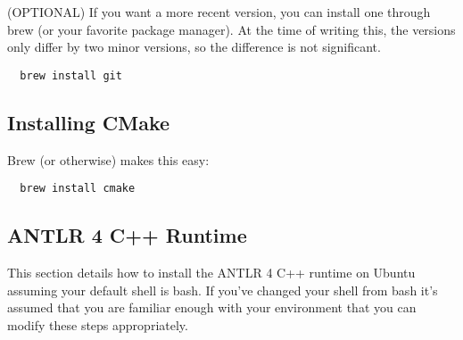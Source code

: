 \documentclass[../setup.tex]{subfiles}
\begin{document}
(OPTIONAL) If you want a more recent version, you can install one through brew (or your favorite
package manager). At the time of writing this, the versions only differ by two minor versions, so
the difference is not significant.
\begin{lstlisting}
  brew install git
\end{lstlisting}

\subsection{Installing CMake}
Brew (or otherwise) makes this easy:
\begin{lstlisting}
  brew install cmake
\end{lstlisting}

\subsection{ANTLR 4 C++ Runtime}
This section details how to install the ANTLR 4 C++ runtime on Ubuntu assuming your default shell
is bash. If you've changed your shell from bash it's assumed that you are familiar enough with your
environment that you can modify these steps appropriately.
\end{document}
